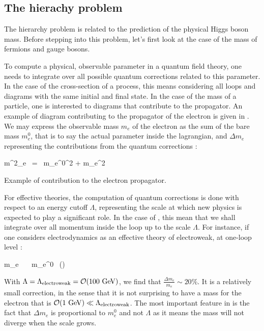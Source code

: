         \subsection{The hierachy problem}

    The hierarchy problem is related to the prediction of the physical Higgs boson mass.
    Before stepping into this problem, let's first look at the case of the mass of fermions
    and gauge bosons.

    To compute a physical, observable parameter in a quantum field theory, one needs to
    integrate over all possible quantum corrections related to this parameter. In the case
    of the cross-section of a process, this means considering all loops and diagrams
    with the same initial and final state. In the case of the mass of a particle, one is
    interested to diagrams that contribute to the propagator. An example of diagram contributing
    to the propagator of the electron is given in . We may
    express the observable mass $m_e$ of the electron as the sum of the bare mass $m^0_{e}$,
    that is to say the actual parameter inside the lagrangian, and $\Delta m_e$ representing
    the contributions from the quantum corrections :

    {
        m^2_e \, = \, {m_e^0}^2 + \Delta m_e^2
    }

                 {Example of contribution to the electron propagator.}

    For effective theories, the computation of quantum corrections is done with respect to
    an energy cutoff $\Lambda$, representing the scale at which new physics is expected
    to play a significant role. In the case of , this mean
    that we shall integrate over all momentum inside the loop up to the scale $\Lambda$.
    For instance, if one considers electrodynamics as an effective theory of electroweak,
    at one-loop level :

    {
        \Delta m_e \, \simeq \, \frac{\alpha}{4\pi} \, m_e^0 \, \left(\right)
    }

    With $\Lambda = \Lambda_{\text{electroweak}} = \mathcal{O}(100~\text{GeV})$, we find that
    $\frac{\Delta m_e}{m_e} \sim 20\%$. It is a relatively small correction, in the sense
    that it is not surprising to have a mass for the electron that is $\mathcal{O}(1~\text{GeV}) \ll \Lambda_{\text{electroweak}}$.
    The most important feature in  is the fact that $\Delta m_e$
    is proportional to $m_e^0$ and not $\Lambda$ as it means the mass will not diverge
    when the scale grows.

